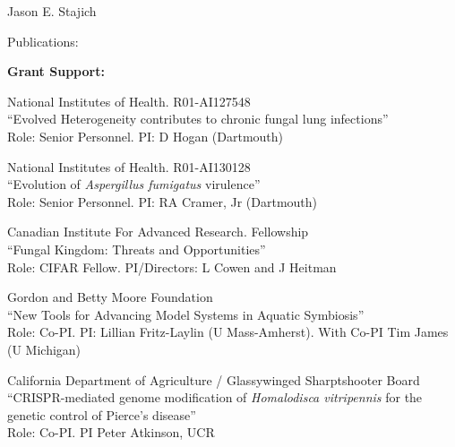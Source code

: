 \documentclass[10pt]{article}
\begin{document}
\begin{cv}{\centerline{Jason E. Stajich}}
\begin{cvlist}{Publications:}
\end{cvlist}
\setlength{\cvlabelwidth}{24mm}


\begin{cvlistcompact}{\bf Grant Support:}
\item [{\bf Ongoing support}]

\item [2017-2026] National Institutes of Health. R01-AI127548 \\
``Evolved Heterogeneity contributes to chronic fungal lung infections'' \\
Role: Senior Personnel. PI: D Hogan (Dartmouth)

\item [2017-2028] National Institutes of Health. R01-AI130128 \\
  ``Evolution of \textit{Aspergillus fumigatus} virulence'' \\
Role: Senior Personnel. PI: RA Cramer, Jr (Dartmouth)

\item [2019-2025] Canadian Institute For Advanced Research. Fellowship \\
  ``Fungal Kingdom: Threats and Opportunities'' \\
Role: CIFAR Fellow. PI/Directors: L Cowen and J Heitman

\item [2020-2023] Gordon and Betty Moore Foundation \\
  ``New Tools for Advancing Model Systems in Aquatic Symbiosis''  \\
Role: Co-PI. PI: Lillian Fritz-Laylin (U Mass-Amherst). With Co-PI Tim James (U Michigan)

\item [2020-2023] California Department of Agriculture / Glassywinged Sharptshooter Board  \\
``CRISPR-mediated genome modification of \textit{Homalodisca vitripennis} for the genetic control of Pierce's disease'' \\
Role: Co-PI. PI Peter Atkinson, UCR


\end{cvlistcompact}
\end{cv}
\end{document}
